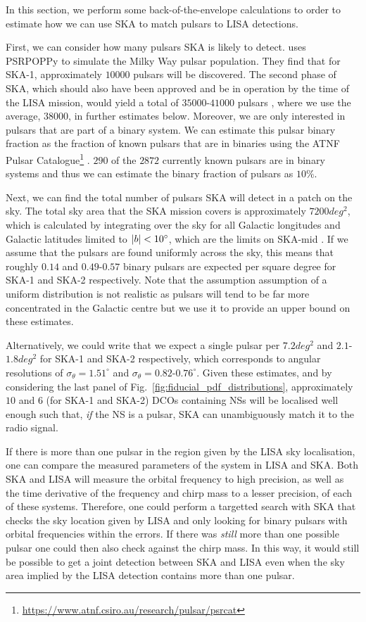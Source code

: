 In this section, we perform some back-of-the-envelope calculations to order to estimate how we can use SKA to match pulsars to LISA detections.

First, we can consider how many pulsars SKA is likely to detect. \citet{Keane+2015} uses PSRPOPPy \citep{Bates+2014} to simulate the Milky Way pulsar population. They find that for SKA-1, approximately $10000$ pulsars will be discovered. The second phase of SKA, which should also have been approved and be in operation by the time of the LISA mission, would yield a total of $35000$-$41000$ pulsars \citep{Keane+2015}, where we use the average, $38000$, in further estimates below. Moreover, we are only interested in pulsars that are part of a binary system. We can estimate this pulsar binary fraction as the fraction of known pulsars that are in binaries using the ATNF Pulsar Catalogue\footnote{\url{https://www.atnf.csiro.au/research/pulsar/psrcat}} \citep{Manchester+2005}. $290$ of the $2872$ currently known pulsars are in binary systems and thus we can estimate the binary fraction of pulsars as $10\%$.

Next, we can find the total number of pulsars SKA will detect in a patch on the sky. The total sky area that the SKA mission covers is approximately $7200 \unit{deg^2}$, which is calculated by integrating over the sky for all Galactic longitudes and Galactic latitudes limited to $\abs{b} < 10^\circ$, which are the limits on SKA-mid \citep{Keane+2015}. If we assume that the pulsars are found uniformly across the sky, this means that roughly $0.14$ and $0.49$-$0.57$ binary pulsars are expected per square degree for SKA-1 and SKA-2 respectively. Note that the assumption assumption of a uniform distribution is not realistic as pulsars will tend to be far more concentrated in the Galactic centre but we use it to provide an upper bound on these estimates.

Alternatively, we could write that we expect a single pulsar per $7.2 \unit{deg^2}$ and $2.1$-$1.8 \unit{deg^2}$ for SKA-1 and SKA-2 respectively, which corresponds to angular resolutions of $\sigma_\theta = 1.51^\circ$ and $\sigma_\theta = 0.82$-$0.76^\circ$. Given these estimates, and by considering the last panel of Fig.~\ref{fig:fiducial_pdf_distributions}, approximately $10$ and $6$ (for SKA-1 and SKA-2) DCOs containing NSs will be localised well enough such that, \textit{if} the NS is a pulsar, SKA can unambiguously match it to the radio signal.

If there is more than one pulsar in the region given by the LISA sky localisation, one can compare the measured parameters of the system in LISA and SKA. Both SKA and LISA will measure the orbital frequency to high precision, as well as the time derivative of the frequency and chirp mass to a lesser precision, of each of these systems. Therefore, one could perform a targetted search with SKA that checks the sky location given by LISA and only looking for binary pulsars with orbital frequencies within the errors. If there was \textit{still} more than one possible pulsar one could then also check against the chirp mass. In this way, it would still be possible to get a joint detection between SKA and LISA even when the sky area implied by the LISA detection contains more than one pulsar.

